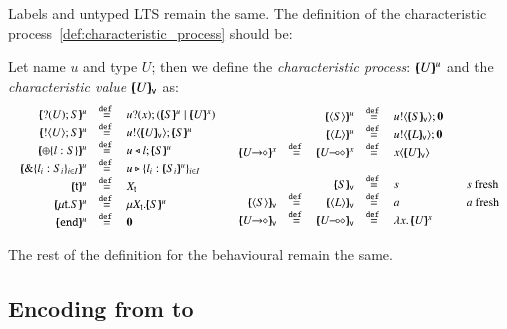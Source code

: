 Labels and untyped LTS remain the same. The definition of the
characteristic process~\ref{def:characteristic_process} should be:
%
\begin{definition}\rm
	\noi Let name $u$ and type $U$; then we define the {\em characteristic process}:
	$[\!\!(U)\!\!]^{u}$ and the {\em characteristic value} $[\!\!(U)\!\!]_{\mathsf{v}}$ as:
%
	\[
	\begin{array}{cc}
		\begin{array}{rclcl}
			\mapchar{\btinp{U} S}{u} &\defeq& \binp{u}{x} (\mapchar{S}{u} \Par \mapchar{U}{x})
			\\
			\mapchar{\btout{U} S}{u} &\defeq& \bout{u}{\omapchar{U}} \mapchar{S}{u} %
			\\
			\mapchar{\btsel{l : S}}{u} &\defeq& \bsel{u}{l} \mapchar{S}{u}
			\\
			\mapchar{\btbra{l_i: S_i}_{i \in I}}{u} &\defeq& \bbra{u}{l_i: \mapchar{S_i}{u}}_{i \in I}
			\\
			\mapchar{\tvar{t}}{u} &\defeq& \varp{X}_{\vart{t}}
			\\
			\mapchar{\trec{t}{S}}{u} &\defeq& \recp{X_{\vart{t}}}{\mapchar{S}{u}}
			\\
			\mapchar{\tinact}{u} &\defeq& \inact
			\\
		\end{array}
		&
		\begin{array}{rcrclcl}
			&&\mapchar{\chtype{S}}{u} &\defeq& \bout{u}{\omapchar{S}} \inact
			\\
			&&\mapchar{\chtype{L}}{u} &\defeq& \bout{u}{\omapchar{L}} \inact
			\\
			\mapchar{\shot{U}}{x} &\defeq& \mapchar{\lhot{U}}{x} &\defeq& \appl{x}{\omapchar{U}}
			\\
			\\
			&&\omapchar{S} &\defeq& s && s \textrm{ fresh}
			\\
			\omapchar{\chtype{S}} &\defeq& \omapchar{\chtype{L}} &\defeq& a && a \textrm{ fresh}
			\\
			\omapchar{\shot{U}} &\defeq& \omapchar{\lhot{U}} &\defeq& \abs{x}{\mapchar{U}{x}}
		\end{array}
	\end{array}
	\]
\end{definition}
%
\noi The rest of the definition for the behavioural remain the same.

\subsection{Encoding from \HOpp to \HOp}

